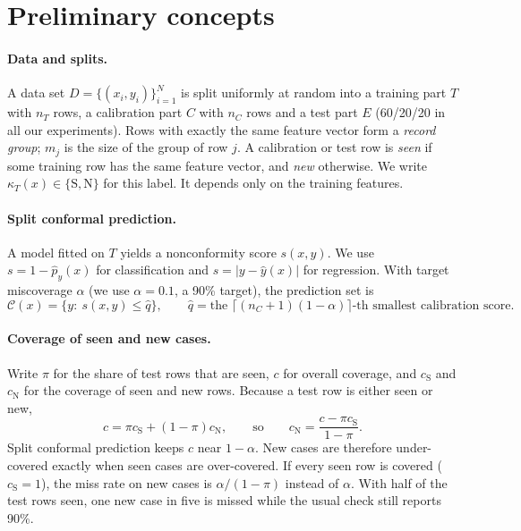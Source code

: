 \section{Preliminary concepts}\label{sec:prelim}

\paragraph{Data and splits.} A data set $D=\{(x_i,y_i)\}_{i=1}^{N}$ is split uniformly at random into a training part $T$ with $n_T$ rows, a calibration part $C$ with $n_C$ rows and a test part $E$ (60/20/20 in all our experiments). Rows with exactly the same feature vector form a \emph{record group}; $m_j$ is the size of the group of row $j$. A calibration or test row is \emph{seen} if some training row has the same feature vector, and \emph{new} otherwise. We write $\kappa_T(x)\in\{\mathrm S,\mathrm N\}$ for this label. It depends only on the training features.

\paragraph{Split conformal prediction.} A model fitted on $T$ yields a nonconformity score $s(x,y)$. We use $s=1-\hat p_y(x)$ for classification and $s=|y-\hat y(x)|$ for regression. With target miscoverage $\alpha$ (we use $\alpha=0.1$, a 90\% target), the prediction set is
\begin{equation}
\mathcal C(x)=\{y:\ s(x,y)\le \hat q\},\qquad \hat q=\text{the }\lceil (n_C+1)(1-\alpha)\rceil\text{-th smallest calibration score.}\label{eq:scp}
\end{equation}

\paragraph{Coverage of seen and new cases.} Write $\pi$ for the share of test rows that are seen, $c$ for overall coverage, and $c_{\mathrm S}$ and $c_{\mathrm N}$ for the coverage of seen and new rows. Because a test row is either seen or new,
\begin{equation}
c=\pi c_{\mathrm S}+(1-\pi)c_{\mathrm N},\qquad\text{so}\qquad c_{\mathrm N}=\frac{c-\pi c_{\mathrm S}}{1-\pi}.\label{eq:decomp}
\end{equation}
Split conformal prediction keeps $c$ near $1-\alpha$. New cases are therefore under-covered exactly when seen cases are over-covered. If every seen row is covered ($c_{\mathrm S}=1$), the miss rate on new cases is $\alpha/(1-\pi)$ instead of $\alpha$. With half of the test rows seen, one new case in five is missed while the usual check still reports 90\%.

